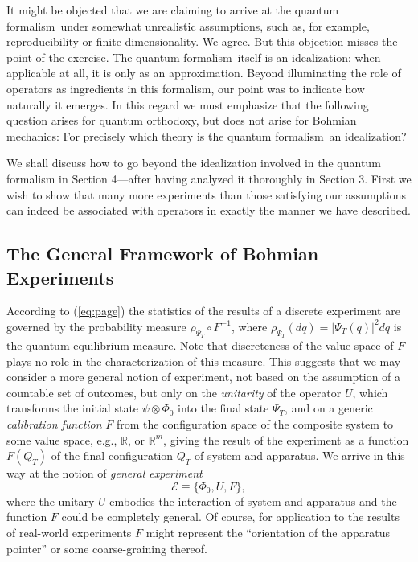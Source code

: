 \documentclass[12pt]{article}
\newcommand{\BM}{Bohmian mechanics}
\newcommand{\qf}{quantum formalism}
\newcommand{\R}{\mathbb{R}}
\newcommand{\E}{\mbox{$\mathscr{E}$}}
\begin{document}
It might be objected that we are claiming to arrive at the \qf\ under
somewhat unrealistic assumptions, such as, for example,
reproducibility or finite dimensionality.  We agree.  But this
objection misses the point of the exercise.  The \qf\ itself is an
idealization; when applicable at all, it is only as an approximation.
Beyond illuminating the role of operators as ingredients in this
formalism, our point was to indicate how naturally it emerges.  In
this regard we must emphasize that the following question arises for
quantum orthodoxy, but does not arise for \BM: For precisely which
theory is the \qf\ an idealization?  \bigskip

We shall discuss how to go beyond the idealization involved in the
quantum formalism in Section 4---after having analyzed it thoroughly
in Section 3.  First we wish to show that many more experiments than
those satisfying our assumptions can indeed be associated with
operators in exactly the manner we have described.

\subsection{The General Framework of Bohmian Experiments}
\label{sec:E}\label{sec:GFE}

According to (\ref{eq:page}) the statistics of the results of a
discrete experiment are governed by the probability measure
$\rho_{\Psi_T}\circ F^{-1}$, where $\rho_{\Psi_T}(dq)
=|\Psi_{T}(q)|^{2}dq$ is the quantum equilibrium measure.  Note that
discreteness of the value space of $F$ plays no role in the
characterization of this measure.  This suggests that we may consider
a more general notion of experiment, not based on the assumption of a
countable set of outcomes, but only on the \emph{unitarity} of the
operator $U$, which transforms the initial state $\psi\otimes\Phi_{0}$
into the final state $\Psi_{T}$, and on a generic \emph{calibration
   function} $F$ {}from the configuration space of the composite system
to some value space, e.g., $\R$, or ${\R}^m$, giving the result of the
experiment as a function $ F(Q_T)$ of the final configuration $Q_T$ of
system and apparatus.  We arrive in this way at the notion of
\emph{general experiment}
\begin{equation}
\E{}\equiv\{\Phi_{0}, U, F\},
\label{eq:generalexperiment}
\end{equation}
where the unitary $U$ embodies the interaction of system and apparatus
and the function $F$ could be completely general.  Of course, for
application to the results of real-world experiments $F$ might
represent the ``orientation of the apparatus pointer'' or some
coarse-graining thereof.
\end{document}
